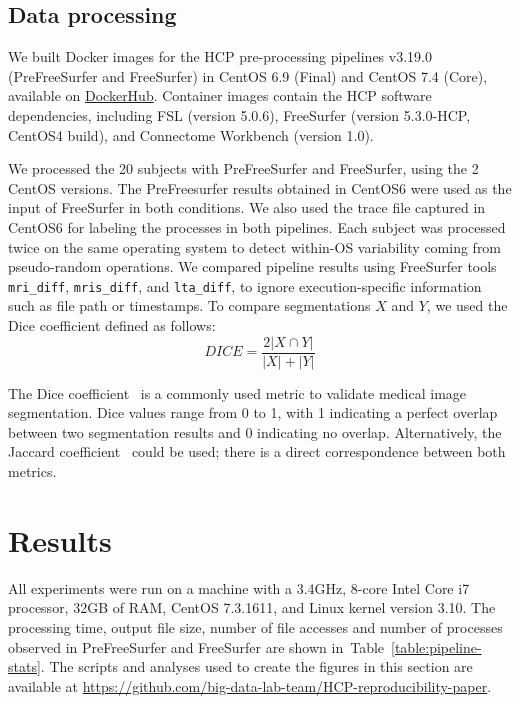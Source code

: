 \subsection{Data processing}

We built Docker images for the HCP pre-processing pipelines v3.19.0
(PreFreeSurfer and FreeSurfer) in CentOS 6.9 (Final) and CentOS 7.4 (Core), available on
\href{https://hub.docker.com/r/bigdatalabteam/hcp-prefreesurfer/}{DockerHub}.
Container images contain the HCP software dependencies, including FSL
(version 5.0.6), FreeSurfer (version 5.3.0-HCP, CentOS4 build), and
Connectome Workbench (version 1.0).

We processed the 20 subjects with PreFreeSurfer and FreeSurfer, using the 2 CentOS versions.
The PreFreesurfer results obtained in CentOS6 were used as the input of FreeSurfer in both conditions. 
We also used the \reprozip trace file captured in CentOS6 for labeling the processes in both pipelines.
Each subject was processed twice on the same operating
system to detect within-OS variability coming from pseudo-random
operations. We compared pipeline results using  FreeSurfer tools \texttt{mri\_diff},
\texttt{mris\_diff}, and \texttt{lta\_diff}, to ignore execution-specific information such as file path or
timestamps. To compare segmentations $X$ and $Y$, we used the Dice coefficient defined as follows:
\[DICE=\frac{2|X \cap Y|}{|X| + |Y|}\]

The Dice coefficient~\cite{dice1945measures} is a commonly used metric to validate medical image segmentation.
Dice values range from 0 to 1, with 1 indicating a perfect overlap between two segmentation results and 0 indicating no overlap.
Alternatively, the Jaccard coefficient~\cite{jaccard1912distribution} could be used;
there is a direct correspondence between both metrics.

\section{Results}
All experiments were run on a machine with a 3.4GHz, 8-core  Intel Core i7 processor, 32GB of RAM, 
CentOS 7.3.1611, and Linux kernel version 3.10.
The processing time, output file size, number of file accesses and number of processes observed in PreFreeSurfer
and FreeSurfer are shown in~Table~\ref{table:pipeline-stats}.
The scripts and analyses used to create the figures in this section are available at
\url{https://github.com/big-data-lab-team/HCP-reproducibility-paper}.

